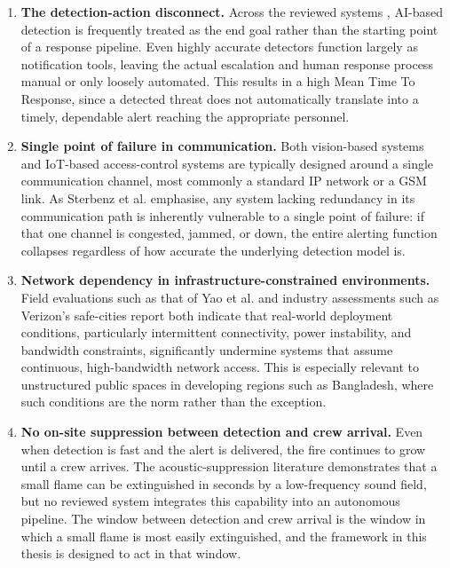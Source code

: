 \begin{enumerate}
\item \textbf{The detection-action disconnect.} Across the reviewed systems \cite{thakur2024weapon,katragada2023atm,behera2025lstm,tauseef2024smartguard,chung2024yololsd}, AI-based detection is frequently treated as the end goal rather than the starting point of a response pipeline. Even highly accurate detectors function largely as notification tools, leaving the actual escalation and human response process manual or only loosely automated. This results in a high Mean Time To Response, since a detected threat does not automatically translate into a timely, dependable alert reaching the appropriate personnel.

\item \textbf{Single point of failure in communication.} Both vision-based systems and IoT-based access-control systems are typically designed around a single communication channel, most commonly a standard IP network or a GSM link. As Sterbenz et al. \cite{sterbenz2010resilience} emphasise, any system lacking redundancy in its communication path is inherently vulnerable to a single point of failure: if that one channel is congested, jammed, or down, the entire alerting function collapses regardless of how accurate the underlying detection model is.

\item \textbf{Network dependency in infrastructure-constrained environments.} Field evaluations such as that of Yao et al. \cite{yao2025field} and industry assessments such as Verizon's safe-cities report both indicate that real-world deployment conditions, particularly intermittent connectivity, power instability, and bandwidth constraints, significantly undermine systems that assume continuous, high-bandwidth network access. This is especially relevant to unstructured public spaces in developing regions such as Bangladesh, where such conditions are the norm rather than the exception.

\item \textbf{No on-site suppression between detection and crew arrival.} Even when detection is fast and the alert is delivered, the fire continues to grow until a crew arrives. The acoustic-suppression literature \cite{darpa2012acoustic,kim2015acoustic,mckinney2019sonic,tran2021portable} demonstrates that a small flame can be extinguished in seconds by a low-frequency sound field, but no reviewed system integrates this capability into an autonomous pipeline. The window between detection and crew arrival is the window in which a small flame is most easily extinguished, and the framework in this thesis is designed to act in that window.


\end{enumerate}
